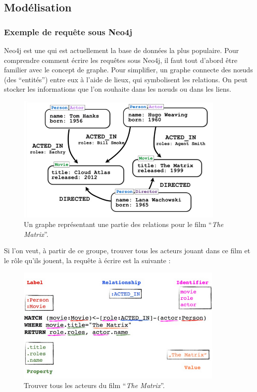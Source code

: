 \subsection{Modélisation}

	\subsubsection{Exemple de requête sous Neo4j}
	Neo4j est une \bddGraphe{} qui est actuellement la base de données la plus populaire. Pour comprendre comment écrire les requêtes sous Neo4j, il faut tout d'abord être familier avec le concept de graphe. Pour simplifier, un graphe connecte des nœuds (des \enquote{entités}) entre eux à l'aide de lieux, qui symbolisent les relations. On peut stocker les informations que l'on souhaite dans les nœuds ou dans les liens.

	\begin{figure}[H]
		\centering
		\includegraphics[width=0.9\textwidth]{images/graphe.png}
		\caption{Un graphe représentant une partie des relations pour le film \enquote{\textit{The Matrix}}.\cite{grapheNeo4j}}
		\label{clusteredIndex}
	\end{figure}

	Si l'on veut, à partir de ce groupe, trouver tous les acteurs jouant dans ce film et le rôle qu'ils jouent, la requête à écrire est la suivante :

		\begin{figure}[H]
		\centering
		\includegraphics[width=0.9\textwidth]{images/requeteNeo4j.png}
		\caption{Trouver tous les acteurs du film \enquote{\textit{The Matrix}}.\cite{grapheNeo4j}}
		\label{clusteredIndex}
	\end{figure}

